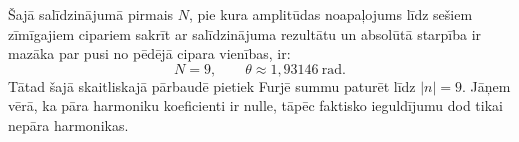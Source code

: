 Šajā salīdzinājumā pirmais $N$, pie kura amplitūdas
noapaļojums līdz sešiem zīmīgajiem cipariem sakrīt
ar salīdzinājuma rezultātu un absolūtā starpība ir
mazāka par pusi no pēdējā cipara vienības, ir:
\[
N=9,
\qquad
\theta\approx1{,}93146\ \mathrm{rad}.
\]
Tātad šajā skaitliskajā pārbaudē pietiek Furjē
summu paturēt līdz $|n|=9$.
Jāņem vērā, ka pāra harmoniku koeficienti ir nulle,
tāpēc faktisko ieguldījumu dod tikai nepāra harmonikas.
\newpage
